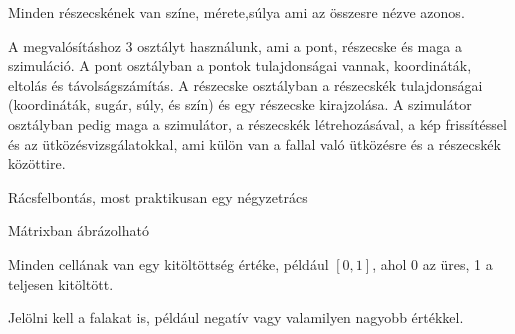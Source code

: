 Minden részecskének van színe, mérete,súlya ami az összesre nézve azonos. 

A megvalósításhoz 3 osztályt használunk, ami a pont, részecske és maga a szimuláció. A pont osztályban a pontok tulajdonságai vannak, koordináták, eltolás és távolságszámítás.  A részecske osztályban  a részecskék tulajdonságai (koordináták, sugár, súly, és szín) és egy részecske kirajzolása. A szimulátor osztályban pedig maga a szimulátor, a részecskék létrehozásával, a kép frissítéssel és az ütközésvizsgálatokkal, ami külön van a fallal való ütközésre és a részecskék közöttire. 


Rácsfelbontás, most praktikusan egy négyzetrács

Mátrixban ábrázolható

Minden cellának van egy kitöltöttség értéke, például $[0, 1]$, ahol 0 az üres, 1 a teljesen kitöltött.

Jelölni kell a falakat is, például negatív vagy valamilyen nagyobb értékkel.

